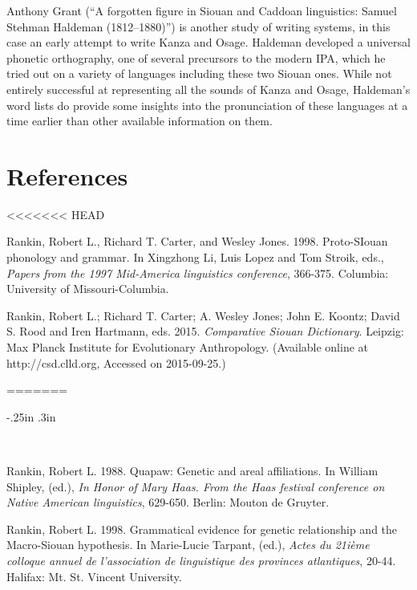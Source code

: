 \begin{refsection}
Anthony Grant (``A forgotten figure in Siouan and Caddoan linguistics: Samuel Stehman Haldeman (1812--1880)'') is another study of writing systems, in this case an early attempt to write Kanza and Osage. Haldeman developed a universal phonetic orthography, one of several precursors to the modern IPA, which he tried out on a variety of languages including these two Siouan ones. While not entirely successful at representing all the sounds of Kanza and Osage, Haldeman's word lists do provide some insights into the pronunciation of these languages at a time earlier than other available information on them. 


\section*{References}

<<<<<<< HEAD
\printbibliography[heading=subbibliography]

\begin{reflist}



Rankin, Robert L., Richard T. Carter, and Wesley Jones. 1998. Proto-SIouan phonology and grammar. In Xingzhong Li, Luis Lopez and Tom Stroik, eds., \textit{Papers from the 1997 Mid-America linguistics conference}, 366-375. Columbia: University of Missouri-Columbia.



Rankin, Robert L.; Richard T. Carter; A. Wesley Jones; John E. Koontz; David S. Rood and Iren Hartmann, eds. 2015. \textit{Comparative Siouan Dictionary}. Leipzig: Max Planck Institute for Evolutionary Anthropology. (Available online at http://csd.clld.org, Accessed on 2015-09-25.)
\end{reflist}
=======
\newenvironment{reflist} {\begin{list} {} {\listparindent -.25in
\leftmargin .3in} \item \ \vspace{-.3in} } {\end{list} }

\begin{reflist}

Rankin, Robert L. 1988. Quapaw: Genetic and areal affiliations. In William Shipley, (ed.), \textit{In Honor of Mary Haas. From the Haas festival conference on Native American linguistics}, 629-650. Berlin: Mouton de Gruyter. 

Rankin, Robert L. 1998. Grammatical evidence for genetic relationship and the Macro-Siouan hypothesis. In Marie-Lucie Tarpant, (ed.), \textit{Actes du 21i\`eme colloque annuel de l'association de linguistique des provinces atlantiques}, 20-44. Halifax: Mt. St. Vincent University. 


\end{reflist}
\end{refsection}

